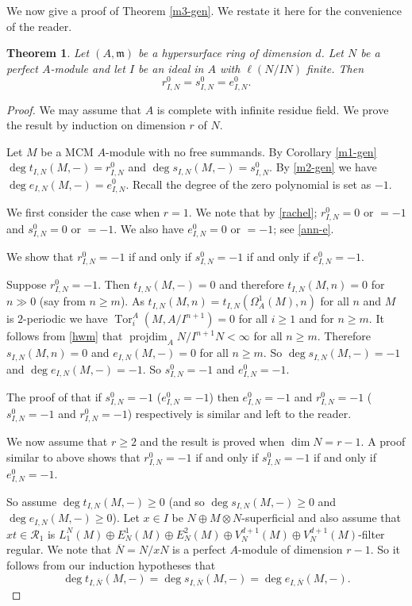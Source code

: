 \documentclass{amsart}
\newcommand{\m}{\mathfrak{m} }
\newcommand{\R}{\mathcal{R} }
\newcommand{\ov}{\overline}
\newcommand{\projdim}{\operatorname{projdim}}
\newcommand{\Tor}{\operatorname{Tor}}
\theoremstyle{plain}
\newtheorem{theorem}{Theorem}[section]
\theoremstyle{definition}
\theoremstyle{remark}
\begin{document}
We now give a proof of Theorem \ref{m3-gen}. We restate it here for the convenience of the reader.
\begin{theorem}\label{m3-gen-body}
Let $(A,\m)$ be a hypersurface ring of dimension $d$. Let $N$ be a perfect $A$-module and let $I$ be an ideal in $A$ with $\ell(N/IN)$ finite.  Then
 $$ r_{I, N}^0 = s_{I, N}^0 = e_{I, N}^0. $$
\end{theorem}
\begin{proof}
We may assume that $A$ is complete with infinite residue field.
We prove the result by induction on dimension $r$ of $N$.


 Let $M$ be a MCM $A$-module with no free summands.  By Corollary \ref{m1-gen} \\
$\deg t_{I,N}(M, -) = r_{I, N}^0$ and $\deg s_{I,N}(M, -) = s_{I, N}^0$.  By \ref{m2-gen} we have \\$\deg e_{I,N}(M, -) = e_{I, N}^0$.
Recall the degree of the zero polynomial is set as $-1$.

 We first consider the case when $r = 1$.  We note that by \ref{rachel}; $r_{I, N}^0 = 0$ or $ = -1$ and   $s_{I, N}^0 = 0 $ or $ = -1$. We also have $e_{I, N}^0 = 0$ or $=-1$; see \ref{ann-e}.

 We show that  $r_{I, N}^0 = -1$ if and only if $s_{I, N}^0  = -1$  if and only if $e_{I, N}^0 = -1$.

 Suppose $r_{I, N}^0 = -1$.
Then $t_{I,N}(M, -) = 0$ and therefore
 $t_{I, N}(M, n) = 0$ for $n \gg 0$ (say from $n \geq m$). As $t_{I, N}(M, n) = t_{I, N}(\Omega^1_A(M), n)$ for all $n$ and $M$ is $2$-periodic we have $\Tor^A_i(M, A/I^{n +1}) = 0$ for all $i \geq 1$ and for $n \geq m$. It follows from \ref{hwm} that $\projdim_A N/I^{n+1}N < \infty$ for all $n \geq m$. Therefore   $s_{I, N}(M, n) = 0$ and $e_{I,N}(M, -) = 0$ for all $n \geq m$.
So $\deg s_{I,N}(M, -) = -1$ and $\deg e_{I,N}(M, -) = -1$.  So $s_{I, N}^0  = -1$  and $e_{I, N}^0 = -1$.


 The proof of that if $s_{I, N}^0  = -1$ ($e_{I, N}^0 = -1$)  then $e_{I, N}^0 = -1$ and $r_{I, N}^0 = -1$ ($s_{I, N}^0  = -1$ and $r_{I, N}^0 = -1$) respectively is similar and left to the reader.

  We now assume that $r \geq 2$ and the result is proved when $\dim N = r -1$.
A proof similar to above shows that
 $r_{I, N}^0 = -1$ if and only if $s_{I, N}^0  = -1$  if and only if $e_{I, N}^0 = -1$.


So assume  $\deg  t_{I,N}(M, -) \geq 0$ (and so  $\deg s_{I,N}(M, -)  \geq 0 $ and $\deg e_{I,N}(M, -) \geq 0$). Let $x \in I$ be $N \oplus M\otimes N$-superficial and also assume that $xt \in \R_1$ is $L_1^N(M) \oplus E^1_N(M) \oplus E_N^2(M) \oplus V^{d+1}_N(M) \oplus V^{d+1}_N(M)$-filter regular.
We note that   $\ov{N} = N/xN$ is a perfect $A$-module of dimension $r -1$. So it follows from our induction hypotheses that
$$\deg t_{I,\ov{N}}(M, -) = \deg s_{I,\ov{N}}(M, -) = \deg e_{I,\ov{N}}(M, -).$$


\end{proof}
\end{document}
